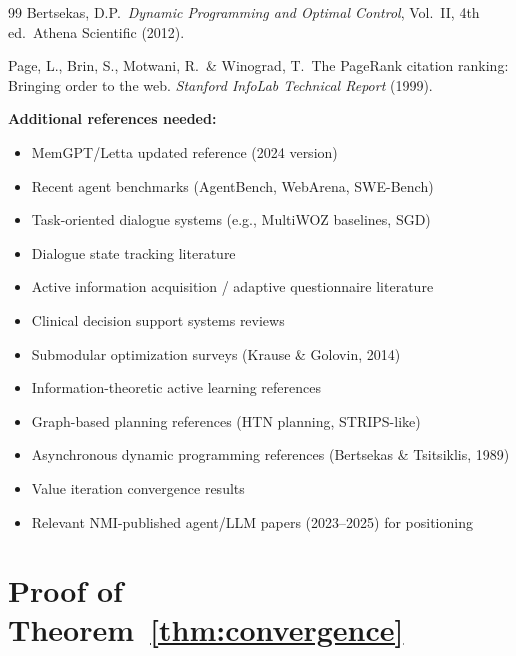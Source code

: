\documentclass[11pt,a4paper]{article}
\newcommand{\placeholder}[1]{%
  \begin{tcolorbox}[colback=yellow!10,colframe=orange!60!black,
    fonttitle=\bfseries,title=Placeholder]
    #1
  \end{tcolorbox}%
}
\begin{document}
\begin{thebibliography}{99}
Bertsekas, D.P.\ \textit{Dynamic Programming and Optimal Control}, Vol.~II,
4th ed.\ Athena Scientific (2012).

Page, L., Brin, S., Motwani, R.\ \& Winograd, T.\
The PageRank citation ranking: Bringing order to the web.
\textit{Stanford InfoLab Technical Report} (1999).

\placeholder{%
  \textbf{Additional references needed:}
  \begin{itemize}[noitemsep]
    \item MemGPT/Letta updated reference (2024 version)
    \item Recent agent benchmarks (AgentBench, WebArena, SWE-Bench)
    \item Task-oriented dialogue systems (e.g., MultiWOZ baselines, SGD)
    \item Dialogue state tracking literature
    \item Active information acquisition / adaptive questionnaire literature
    \item Clinical decision support systems reviews
    \item Submodular optimization surveys (Krause \& Golovin, 2014)
    \item Information-theoretic active learning references
    \item Graph-based planning references (HTN planning, STRIPS-like)
    \item Asynchronous dynamic programming references (Bertsekas \&
          Tsitsiklis, 1989)
    \item Value iteration convergence results
    \item Relevant NMI-published agent/LLM papers (2023--2025) for
          positioning
  \end{itemize}
}

\end{thebibliography}


\newpage
\appendix
\renewcommand{\thesection}{Supplementary \Alph{section}}

\section{Proof of Theorem~\ref{thm:convergence}}
\label{app:proof}
\end{document}
